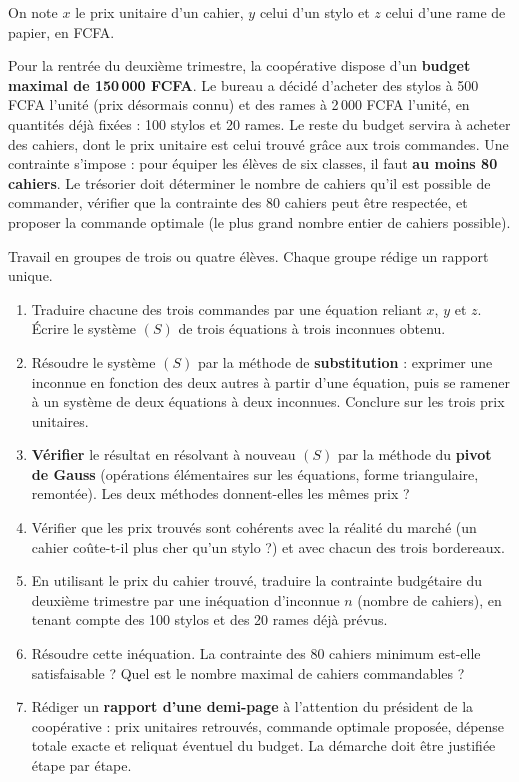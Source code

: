 \documentclass[11pt]{article}
\newcounter{popsec}
\newcounter{popsub}
\newcommand{\courssub}[1]{%
  \stepcounter{popsub}%
  \par\vspace{9pt}\noindent{\popxbold\fontsize{11.5}{13}\selectfont\color{popink}{\color{poporange}\thepopsec.\thepopsub}\hspace{6pt}#1}\par\nopagebreak\vspace{4pt}
}
\begin{document}
On note $x$ le prix unitaire d'un cahier, $y$ celui d'un stylo et $z$ celui d'une rame de papier, en FCFA.

Pour la rentrée du deuxième trimestre, la coopérative dispose d'un \textbf{budget maximal de 150\,000 FCFA}. Le bureau a décidé d'acheter des stylos à 500 FCFA l'unité (prix désormais connu) et des rames à 2\,000 FCFA l'unité, en quantités déjà fixées : 100 stylos et 20 rames. Le reste du budget servira à acheter des cahiers, dont le prix unitaire est celui trouvé grâce aux trois commandes. Une contrainte s'impose : pour équiper les élèves de six classes, il faut \textbf{au moins 80 cahiers}. Le trésorier doit déterminer le nombre de cahiers qu'il est possible de commander, vérifier que la contrainte des 80 cahiers peut être respectée, et proposer la commande optimale (le plus grand nombre entier de cahiers possible).

\courssub{Consignes}

Travail en groupes de trois ou quatre élèves. Chaque groupe rédige un rapport unique.

\begin{enumerate}
\item Traduire chacune des trois commandes par une équation reliant $x$, $y$ et $z$. Écrire le système $(S)$ de trois équations à trois inconnues obtenu.
\item Résoudre le système $(S)$ par la méthode de \textbf{substitution} : exprimer une inconnue en fonction des deux autres à partir d'une équation, puis se ramener à un système de deux équations à deux inconnues. Conclure sur les trois prix unitaires.
\item \textbf{Vérifier} le résultat en résolvant à nouveau $(S)$ par la méthode du \textbf{pivot de Gauss} (opérations élémentaires sur les équations, forme triangulaire, remontée). Les deux méthodes donnent-elles les mêmes prix ?
\item Vérifier que les prix trouvés sont cohérents avec la réalité du marché (un cahier coûte-t-il plus cher qu'un stylo ?) et avec chacun des trois bordereaux.
\item En utilisant le prix du cahier trouvé, traduire la contrainte budgétaire du deuxième trimestre par une inéquation d'inconnue $n$ (nombre de cahiers), en tenant compte des 100 stylos et des 20 rames déjà prévus.
\item Résoudre cette inéquation. La contrainte des 80 cahiers minimum est-elle satisfaisable ? Quel est le nombre maximal de cahiers commandables ?
\item Rédiger un \textbf{rapport d'une demi-page} à l'attention du président de la coopérative : prix unitaires retrouvés, commande optimale proposée, dépense totale exacte et reliquat éventuel du budget. La démarche doit être justifiée étape par étape.
\end{enumerate}
\end{document}
